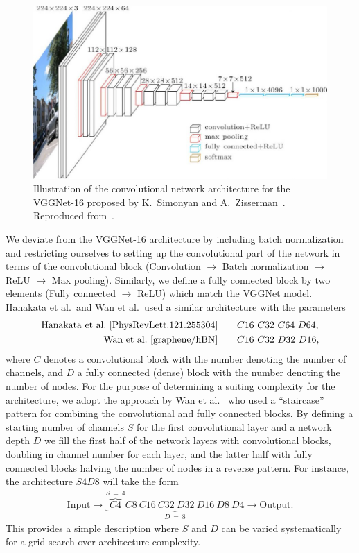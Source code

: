 \begin{figure}[!htb]
  \centering
  \includegraphics[width=0.7\linewidth]{figures/ML/VGGNet16.jpg}
  \caption{Illustration of the convolutional network architecture for the VGGNet-16 proposed by K.\ Simonyan and A.\ Zisserman~\cite{simonyan2015deep}. Reproduced from~\cite{VGGNet_16_image}.}
  \label{fig:VGGNet16}
\end{figure}

We deviate from the VGGNet-16 architecture by including batch normalization and restricting ourselves to setting up the convolutional part of the network in terms of the convolutional block (Convolution $\to$ Batch normalization $\to$ ReLU $\to$ Max pooling). Similarly, we define a fully connected block by two elements (Fully connected $\to$ ReLU) which match the VGGNet model. Hanakata et al.\ and Wan et al.\ used a similar architecture with the parameters 
\begin{align*}
  \text{Hanakata et al.~\cite{PhysRevLett.121.255304}} & \qquad C16 \ C32 \ C64 \ D64, \\ 
  \text{Wan et al.~\cite{graphene/hBN}} & \qquad C16 \ C32 \ D32 \ D16,
\end{align*}
where $C$ denotes a convolutional block with the number denoting the number of channels, and $D$ a fully connected (dense) block with the number denoting the number of nodes. For the purpose of determining a suiting complexity for the architecture, we adopt the approach by Wan et al.~\cite{graphene/hBN} who used a ``staircase'' pattern for combining the convolutional and fully connected blocks. By defining a starting number of channels $S$ for the first convolutional layer and a network depth $D$ we fill the first half of the network layers with convolutional blocks, doubling in channel number for each layer, and the latter half with fully connected blocks halving the number of nodes in a reverse pattern. For instance, the architecture $S4D8$ will take the form
\begin{align}
  \text{Input} \to \underbrace{\overbrace{C4}^{S \ = \ 4}C8 \ C16 \ C32 \ D32 \ D16 \ D8 \ D4}_{D \ = \ 8} \to \text{Output}.
  \label{eq:staircase_example}
\end{align} 
This provides a simple description where $S$ and $D$ can be varied systematically for a grid search over architecture complexity. 


